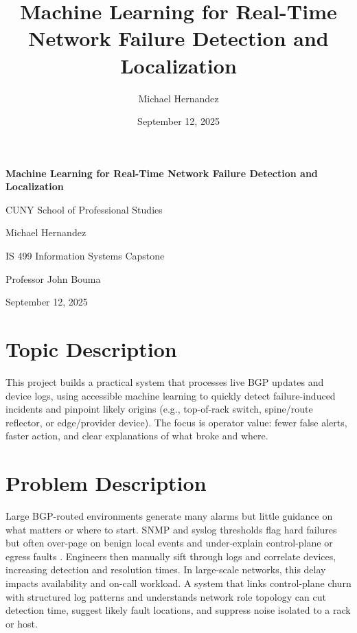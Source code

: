 \documentclass[11pt]{article}
\title{Machine Learning for Real-Time Network Failure Detection and Localization}
\author{Michael Hernandez}
\date{September 12, 2025}
\begin{document}
\begin{titlepage}
\centering
\vspace*{2cm}

{\Large \textbf{Machine Learning for Real-Time Network Failure Detection and Localization}}

\vspace{1.5cm}

{\large CUNY School of Professional Studies}

\vspace{0.5cm}

{\large Michael Hernandez}

\vspace{0.5cm}

{\large IS 499 Information Systems Capstone}

\vspace{0.5cm}

{\large Professor John Bouma}

\vspace{0.5cm}

{\large September 12, 2025}

\vfill

\end{titlepage}

\section{Topic Description}

This project builds a practical system that processes live BGP updates and device logs, using accessible machine learning to quickly detect failure-induced incidents and pinpoint likely origins (e.g., top-of-rack switch, spine/route reflector, or edge/provider device). The focus is operator value: fewer false alerts, faster action, and clear explanations of what broke and where.

\section{Problem Description}

Large BGP-routed environments generate many alarms but little guidance on what matters or where to start. SNMP and syslog thresholds flag hard failures but often over-page on benign local events and under-explain control-plane or egress faults \cite{mohammed2021}. Engineers then manually sift through logs and correlate devices, increasing detection and resolution times. In large-scale networks, this delay impacts availability and on-call workload. A system that links control-plane churn with structured log patterns and understands network role topology can cut detection time, suggest likely fault locations, and suppress noise isolated to a rack or host.
\end{document}
